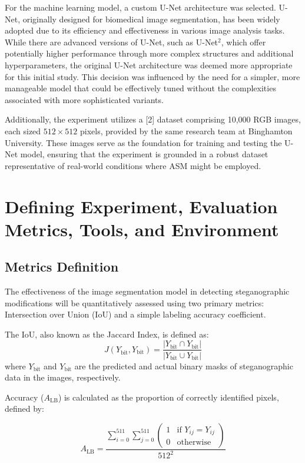 \documentclass[12pt,a4paper]{article}
\begin{document}
For the machine learning model, a custom U-Net architecture was selected. U-Net, originally designed for biomedical image segmentation, has been widely adopted due to its efficiency and effectiveness in various image analysis tasks. While there are advanced versions of U-Net, such as U-Net\(^2\), which offer potentially higher performance through more complex structures and additional hyperparameters, the original U-Net architecture was deemed more appropriate for this initial study. This decision was influenced by the need for a simpler, more manageable model that could be effectively tuned without the complexities associated with more sophisticated variants.

Additionally, the experiment utilizes a [2] dataset comprising 10,000 RGB images, each sized \(512 \times 512\) pixels, provided by the same research team at Binghamton University. These images serve as the foundation for training and testing the U-Net model, ensuring that the experiment is grounded in a robust dataset representative of real-world conditions where ASM might be employed.

\section{Defining Experiment, Evaluation Metrics, Tools, and Environment}

\subsection{Metrics Definition}
The effectiveness of the image segmentation model in detecting steganographic modifications will be quantitatively assessed using two primary metrics: Intersection over Union (IoU) and a simple labeling accuracy coefficient.

The IoU, also known as the Jaccard Index, is defined as:
\[
J(Y_{\text{bit}}^{\hat{}}, Y_{\text{bit}}) = \frac{|Y_{\text{bit}}^{\hat{}} \cap Y_{\text{bit}}|}{|Y_{\text{bit}}^{\hat{}} \cup Y_{\text{bit}}|}
\]
where \( Y_{\text{bit}}^{\hat{}} \) and \( Y_{\text{bit}} \) are the predicted and actual binary masks of steganographic data in the images, respectively.

Accuracy (\( A_{\text{LB}} \)) is calculated as the proportion of correctly identified pixels, defined by:

\[
A_{\text{LB}} = \frac{\sum_{i=0}^{511} \sum_{j=0}^{511} \left( \begin{array}{cc}
1 & \text{if } Y_{ij}^{\hat{}} = Y_{ij} \\
0 & \text{otherwise}
\end{array} \right)}{512^2}
\]
\end{document}
